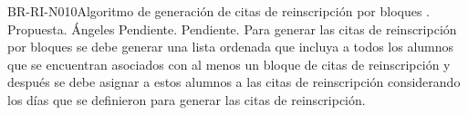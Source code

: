 \begin{BusinessRule}{BR-RI-N010}{Algoritmo de generación de citas de reinscripción por bloques}
	{\bcDerivation}   %
	{\btTimer}    %
	{\blControlling}    %
	.
	\BRItem[Estado] Propuesta.
	 Ángeles 
	 Pendiente.
	 Pendiente.
	\BRItem[Descripción] Para generar las citas de reinscripción por bloques se debe generar una lista ordenada que incluya a todos los alumnos que se encuentran asociados con al menos un bloque de citas de reinscripción y después se debe asignar a estos alumnos a las citas de reinscripción considerando los días que se definieron para generar las citas de reinscripción.

	

\end{BusinessRule}
